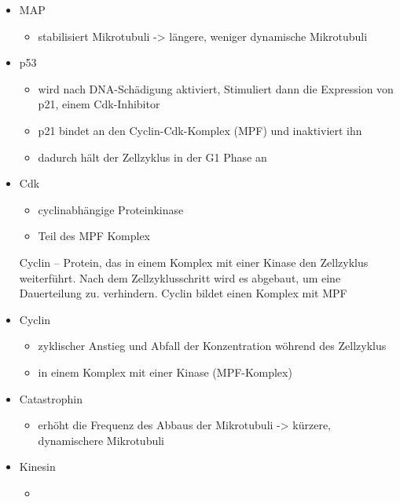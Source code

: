 \documentclass{article}
\begin{document}
\begin{itemize}
    \item MAP
        \begin{itemize}
            \item stabilisiert Mikrotubuli -> längere, weniger dynamische Mikrotubuli
        \end{itemize}
    
    \item p53
        \begin{itemize}
            \item wird nach DNA-Schädigung aktiviert, Stimuliert dann die Expression von p21, einem Cdk-Inhibitor
            \item p21 bindet an den Cyclin-Cdk-Komplex (MPF) und inaktiviert ihn
            \item dadurch hält der Zellzyklus in der G1 Phase an
        \end{itemize}
        
    \item Cdk
        \begin{itemize}
            \item cyclinabhängige Proteinkinase
            \item Teil des MPF Komplex
        \end{itemize}
        
    Cyclin -- Protein, das in einem Komplex mit einer Kinase den Zellzyklus weiterführt. Nach dem Zellzyklusschritt wird es abgebaut, um eine Dauerteilung zu. verhindern. Cyclin bildet einen Komplex mit MPF 
    
    \item Cyclin
        \begin{itemize}
            \item zyklischer Anstieg und Abfall der Konzentration wöhrend des Zellzyklus
            \item in einem Komplex mit einer Kinase (MPF-Komplex)
        \end{itemize}
        
    \item Catastrophin
        \begin{itemize}
            \item erhöht die Frequenz des Abbaus der Mikrotubuli -> kürzere, dynamischere Mikrotubuli
        \end{itemize}

    \item Kinesin
        \begin{itemize}
            \item 
        \end{itemize}
        

\end{itemize}
\end{document}
